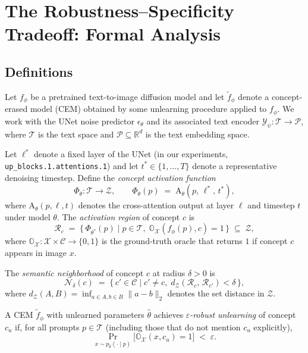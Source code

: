 \section{The Robustness--Specificity Tradeoff: Formal Analysis}

\subsection{Definitions}

Let $f_\phi$ be a pretrained text-to-image diffusion model and let
$\tilde{f}_\phi$ denote a concept-erased model (CEM) obtained by some
unlearning procedure applied to $f_\phi$. We work with the UNet noise
predictor $\epsilon_\theta$ and its associated text encoder
$\mathcal{Y}_\psi : \mathcal{T} \to \mathcal{P}$, where $\mathcal{T}$
is the text space and $\mathcal{P} \subseteq \mathbb{R}^d$ is the text
embedding space.

\begin{definition}
Let $\ell^*$ denote a fixed layer of the UNet (in our experiments,
\texttt{up\_blocks.1.attentions.1}) and let $t^* \in \{1,\ldots,T\}$
denote a representative denoising timestep. Define the
\emph{concept activation function}
\[
    \Phi_\theta : \mathcal{T} \longrightarrow \mathcal{Z}, \qquad
    \Phi_\theta(p) \;=\; \mathrm{A}_\theta(p,\, \ell^*,\, t^*),
\]
where $\mathrm{A}_\theta(p,\ell,t)$ denotes the cross-attention output
at layer $\ell$ and timestep $t$ under model $\theta$. The
\emph{activation region} of concept $c$ is
\[
    \mathcal{R}_c \;=\; \bigl\{\, \Phi_{\theta^*}(p) \;\big|\;
    p \in \mathcal{T},\; \mathbb{O}_\mathcal{X}(f_\phi(p), c) = 1
    \,\bigr\} \;\subseteq\; \mathcal{Z},
\]
where $\mathbb{O}_\mathcal{X} : \mathcal{X} \times \mathcal{C}
\to \{0,1\}$ is the ground-truth oracle that returns $1$ if concept
$c$ appears in image $x$.
\end{definition}

\begin{definition}
The \emph{semantic neighborhood} of concept $c$ at radius $\delta > 0$
is
\[
    \mathcal{N}_\delta(c) \;=\; \bigl\{\, c' \in \mathcal{C}
    \;\big|\; c' \neq c, \;
    d_\mathcal{Z}\!\left(\mathcal{R}_c,\, \mathcal{R}_{c'}\right)
    < \delta \,\bigr\},
\]
where $d_\mathcal{Z}(A,B) = \inf_{a \in A, b \in B}\|a - b\|_2$
denotes the set distance in $\mathcal{Z}$.
\end{definition}

\begin{definition}
\label{def:robust}
A CEM $\tilde{f}_\phi$ with unlearned parameters $\hat\theta$ achieves
\emph{$\varepsilon$-robust unlearning} of concept $c_u$ if, for all
prompts $p \in \mathcal{T}$ (including those that do not mention $c_u$
explicitly),
\[
    \Pr_{x \sim p_{\hat\theta}(\cdot \mid p)}\!\bigl[
    \mathbb{O}_\mathcal{X}(x, c_u) = 1\bigr] \;<\; \varepsilon.
\]
\end{definition}

